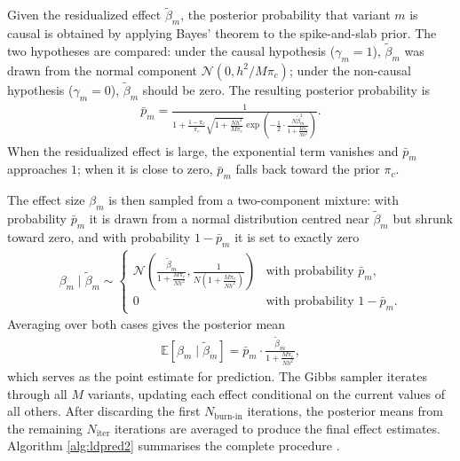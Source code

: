 Given the residualized effect $\tilde{\beta}_m$, the posterior probability that variant $m$ is causal is obtained by applying Bayes' theorem to the spike-and-slab prior. The two hypotheses are compared: under the causal hypothesis ($\gamma_m = 1$), $\tilde{\beta}_m$ was drawn from the normal component $\mathcal{N}(0, h^2 / M\pi_c)$; under the non-causal hypothesis ($\gamma_m = 0$), $\tilde{\beta}_m$ should be zero. The resulting posterior probability is
\begin{align*}
\bar{p}_m = \frac{1}{1 + \frac{1-\pi_c}{\pi_c} \sqrt{1 + \frac{Nh^2}{M\pi_c}} \exp\left(-\frac{1}{2} \cdot \frac{N\tilde{\beta}_m^2}{1 + \frac{M\pi_c}{Nh^2}}\right)}.
\end{align*}
When the residualized effect is large, the exponential term vanishes and $\bar{p}_m$ approaches $1$; when it is close to zero, $\bar{p}_m$ falls back toward the prior $\pi_c$.

The effect size $\beta_m$ is then sampled from a two-component mixture: with probability $\bar{p}_m$ it is drawn from a normal distribution centred near $\tilde{\beta}_m$ but shrunk toward zero, and with probability $1 - \bar{p}_m$ it is set to exactly zero
\begin{align*}
\beta_m \mid \tilde{\beta}_m \sim \begin{cases} \mathcal{N}\left(\frac{\tilde{\beta}_m}{1 + \frac{M\pi_c}{Nh^2}}, \frac{1}{N\left(1 + \frac{M\pi_c}{Nh^2}\right)}\right) & \text{with probability } \bar{p}_m, \\ 0 & \text{with probability } 1 - \bar{p}_m. \end{cases}
\end{align*}
Averaging over both cases gives the posterior mean
\begin{align*}
\mathbb{E}[\beta_m \mid \tilde{\beta}_m] = \bar{p}_m \cdot \frac{\tilde{\beta}_m}{1 + \frac{M\pi_c}{Nh^2}},
\end{align*}
which serves as the point estimate for prediction. The Gibbs sampler iterates through all $M$ variants, updating each effect conditional on the current values of all others. After discarding the first $N_{\text{burn-in}}$ iterations, the posterior means from the remaining $N_{\text{iter}}$ iterations are averaged to produce the final effect estimates. Algorithm \autoref{alg:ldpred2} summarises the complete procedure \citep{Prive2020}.

